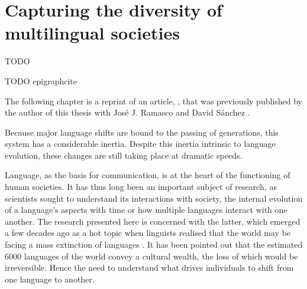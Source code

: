 \documentclass[../thesis.tex]{subfiles}
\begin{document}
\chapter{Capturing the diversity of multilingual societies}
\label{ch:multiling}

\epigraph{
  TODO
}{
  TODO epigraphcite
}

The following chapter is a reprint of an article, , that
was previously published by the author of this thesis with Jos\'{e} J. Ramasco and David S\'{a}nchez \cite{LoufCapturingDiversity2021}.


Because major language shifts are bound to the passing of generations, this system has a considerable inertia. Despite this inertia intrinsic to language evolution, these changes are still taking place at dramatic speeds.


Language, as the basis for communication, is at the heart of the functioning of human
societies. It has thus long been an important subject of research, as scientists sought
to understand its interactions with society, the internal evolution of a language's
aspects with time or how multiple languages interact with one another. The research
presented here is concerned with the latter, which emerged a few decades ago as a hot
topic when linguists realised that the world may be facing a mass extinction of
languages
\cite{KraussWorldLanguages1992,GrenobleEndangeredLanguages1998,CrystalLanguageDeath2000}.
It has been pointed out that the estimated \SI{6000}{} languages of the world convey a
cultural wealth, the loss of which would be irreversible. Hence the need to understand
what drives individuals to shift from one language to another.
\end{document}
